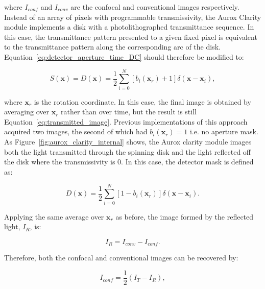 where $I_{conf}$ and $I_{conv}$ are the confocal and 
conventional images respectively. Instead of an array of 
pixels with programmable transmissivity, the Aurox Clarity 
module implements a disk with a photolithographed 
transmittance sequence. In this case, the transmittance 
pattern presented to a given fixed pixel is equivalent to 
the transmittance pattern along the corresponding arc of 
the disk\cite{wilson1996confocal}. 
Equation~\ref{eq:detector_aperture_time_DC} should therefore 
be modified to:

\begin{equation}\label{eq:detector_aperture_arc}
S\left(\textbf{x}\right) = D\left(\textbf{x}\right) = \frac{1}{2} \sum_{i=0}^{N} \left[b_{i}\left(\textbf{x}_{r}\right) + 1\right]\delta\left(\textbf{x} - \textbf{x}_{i}\right),
\end{equation}

where $\textbf{x}_{r}$ is the rotation coordinate. In 
this case, the final image is obtained by averaging over 
$\textbf{x}_{r}$ rather than over time, but the result is 
still Equation~\ref{eq:transmitted_image}. Previous 
implementations of this approach acquired two images, the 
second of which had $b_{i}\left(\textbf{x}_{r}\right) = 1$ 
i.e. no aperture mask. As Figure~\ref{fig:aurox_clarity_internal} 
shows, the Aurox clarity module images both the light 
transmitted through the spinning disk and the light 
reflected off the disk where the transmissivity is $0$. In 
this case, the detector mask is defined as:

\begin{equation}\label{eq:detector_aperture_arc_reflect}
D\left(\textbf{x}\right) = \frac{1}{2} \sum_{i=0}^{N} \left[1 - b_{i}\left(\textbf{x}_{r}\right)\right]\delta\left(\textbf{x} - \textbf{x}_{i}\right).
\end{equation}

Applying the same average over $\textbf{x}_{r}$ as before, 
the image formed by the reflected light, $I_{R}$, is:

\begin{equation}\label{eq:reflected_image}
I_{R} = I_{conv} - I_{conf}.
\end{equation}

Therefore, both the confocal and conventional images can 
be recovered by:

\begin{equation}\label{eq:confocal_image}
I_{conf} = \frac{1}{2}\left(I_{T} - I_{R}\right),
\end{equation}

